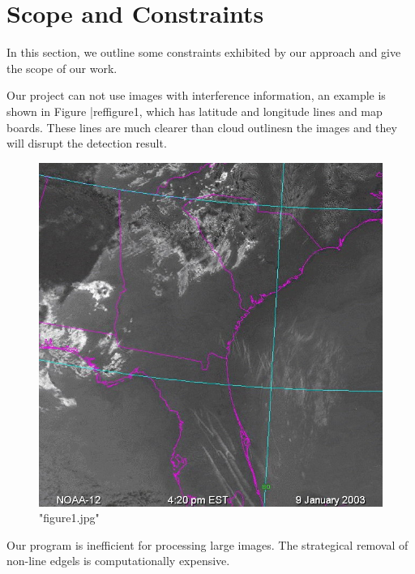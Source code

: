 \section{Scope and Constraints}
In this section, we outline some constraints exhibited by our approach and give
the scope of our work.

Our project can not use images with interference information, an example is shown
in Figure |ref{figure1}, which has latitude and longitude lines and map boards. 
These lines are much clearer than cloud outlinesn the images and they will 
disrupt the detection result.
\begin{figure}[htb!]
\centering
\includegraphics[scale=0.5]{pic/figure1.jpg}
\caption[Short form for the mapping directory]{"figure1.jpg"}
\label{figure1}
\end{figure}
Our program is inefficient for processing large images. The 
strategical removal of non-line edgels is computationally expensive.
